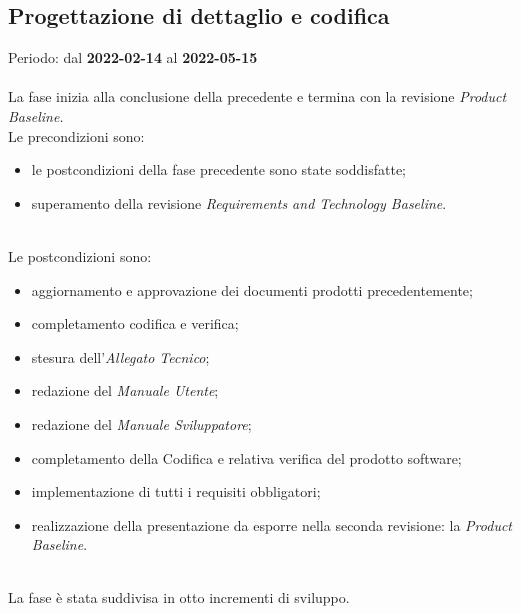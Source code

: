 \subsection{Progettazione di dettaglio e codifica}
Periodo: dal \textbf{2022-02-14} al \textbf{2022-05-15} \mbox{} \\ \mbox{} \\
La fase inizia alla conclusione della precedente e termina con la revisione \textit{Product Baseline.} \mbox{} \\
Le precondizioni sono:
\begin{itemize}
	\item le postcondizioni della fase precedente sono state soddisfatte;
 	\item superamento della revisione \textit{Requirements and Technology Baseline}.
\end{itemize} \mbox{} \\
Le postcondizioni sono:
\begin{itemize}
	\item aggiornamento e approvazione dei documenti prodotti precedentemente;
	\item completamento codifica e verifica;
	\item stesura dell'\textit{Allegato Tecnico};
	\item redazione del \textit{Manuale Utente};
 	\item redazione del \textit{Manuale Sviluppatore};
    \item completamento della Codifica e relativa verifica del prodotto software;
    \item implementazione di tutti i requisiti obbligatori;
	\item realizzazione della presentazione da esporre nella seconda revisione: la \textit{Product Baseline}\glo{}. 
\end{itemize} \mbox{} \\
La fase è stata suddivisa in otto incrementi di sviluppo.

\pagebreak

